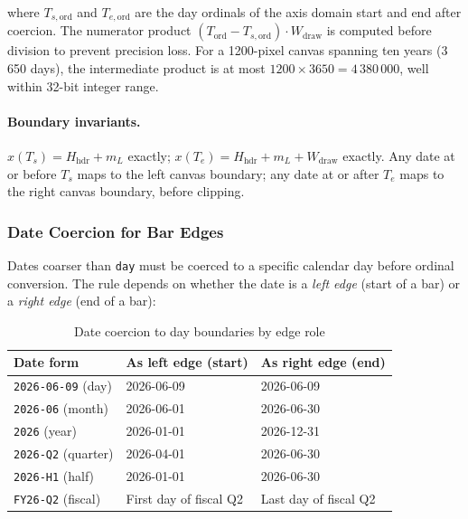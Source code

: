 where $T_{s,\mathrm{ord}}$ and $T_{e,\mathrm{ord}}$ are the day ordinals of the axis domain
start and end after coercion. The numerator product
$(T_{\mathrm{ord}} - T_{s,\mathrm{ord}}) \cdot W_{\mathrm{draw}}$ is computed before division
to prevent precision loss. For a 1200-pixel canvas spanning ten years (3\,650 days), the
intermediate product is at most $1200 \times 3650 = 4\,380\,000$, well within 32-bit
integer range.

\paragraph{Boundary invariants.}
$x(T_s) = H_{\mathrm{hdr}} + m_L$ exactly;
$x(T_e) = H_{\mathrm{hdr}} + m_L + W_{\mathrm{draw}}$ exactly. Any date at or before $T_s$
maps to the left canvas boundary; any date at or after $T_e$ maps to the right canvas
boundary, before clipping.

\subsubsection{Date Coercion for Bar Edges}
\label{sec:date-coercion}

Dates coarser than \texttt{day} must be coerced to a specific calendar day before ordinal
conversion. The rule depends on whether the date is a \emph{left edge} (start of a bar) or
a \emph{right edge} (end of a bar):

\begin{table}[h]
\centering
\small
\begin{tabular}{lll}
\toprule
\textbf{Date form} & \textbf{As left edge (start)} & \textbf{As right edge (end)} \\
\midrule
\texttt{2026-06-09}  (day)    & 2026-06-09 & 2026-06-09 \\
\texttt{2026-06}     (month)  & 2026-06-01 & 2026-06-30 \\
\texttt{2026}        (year)   & 2026-01-01 & 2026-12-31 \\
\texttt{2026-Q2}     (quarter)& 2026-04-01 & 2026-06-30 \\
\texttt{2026-H1}     (half)   & 2026-01-01 & 2026-06-30 \\
\texttt{FY26-Q2}     (fiscal) & First day of fiscal Q2 & Last day of fiscal Q2 \\
\bottomrule
\end{tabular}
\caption{Date coercion to day boundaries by edge role}
\label{tab:date-coercion}
\end{table}

